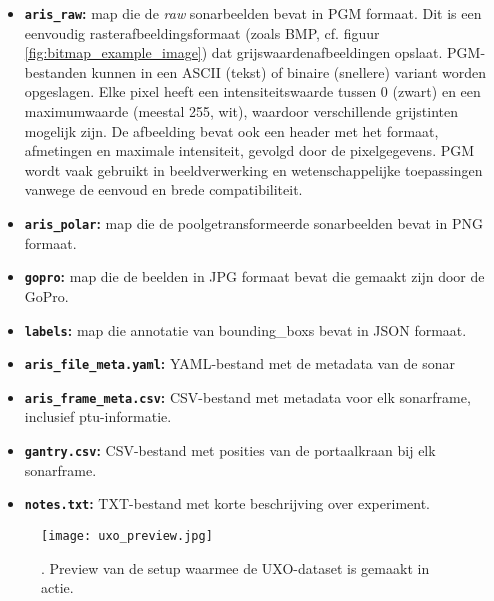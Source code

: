 \begin{itemize}
    \item \textbf{\texttt{aris\_raw}:} map die de \emph{raw} sonarbeelden bevat in PGM formaat. Dit is een eenvoudig rasterafbeeldingsformaat (zoals BMP, cf. figuur \ref{fig:bitmap_example_image}) dat grijswaardenafbeeldingen opslaat. PGM-bestanden kunnen in een ASCII (tekst) of binaire (snellere) variant worden opgeslagen. Elke pixel heeft een intensiteitswaarde tussen 0 (zwart) en een maximumwaarde (meestal 255, wit), waardoor verschillende grijstinten mogelijk zijn. De afbeelding bevat ook een header met het formaat, afmetingen en maximale intensiteit, gevolgd door de pixelgegevens. PGM wordt vaak gebruikt in beeldverwerking en wetenschappelijke toepassingen vanwege de eenvoud en brede compatibiliteit. \autocite{Poskanzer_2016}
    \item \textbf{\texttt{aris\_polar}:} map die de poolgetransformeerde sonarbeelden bevat in PNG formaat.
    \item \textbf{\texttt{gopro}:} map die de beelden in JPG formaat bevat die gemaakt zijn door de GoPro.
    \item \textbf{\texttt{labels}:} map die annotatie van \glspl{bounding_box} bevat in JSON formaat.
    \item \textbf{\texttt{aris\_file\_meta.yaml}:} YAML-bestand met de metadata van de sonar 
    \item \textbf{\texttt{aris\_frame\_meta.csv}:} CSV-bestand met metadata voor elk sonarframe, inclusief \gls{ptu}-informatie.
    \item \textbf{\texttt{gantry.csv}:} CSV-bestand met posities van de \gls{portaalkraan} bij elk sonarframe.
    \item \textbf{\texttt{notes.txt}:} TXT-bestand met korte beschrijving over experiment.
\end{itemize}

\begin{figure}[H]
    \centering
    \texttt{[image: uxo\_preview.jpg]}
    \caption[UXO-setup in actie]{\label{fig:uxo_preview}. Preview van de setup waarmee de UXO-dataset is gemaakt in actie. \autocite{Dahn_2024_UXO}}
\end{figure}

\clearpage